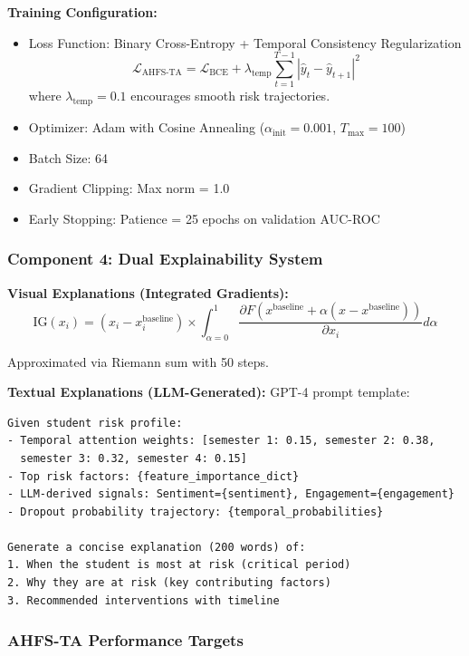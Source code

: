 \textbf{Training Configuration:}
\begin{itemize}
\item Loss Function: Binary Cross-Entropy + Temporal Consistency Regularization
\begin{equation}
\mathcal{L}_{\text{AHFS-TA}} = \mathcal{L}_{\text{BCE}} + \lambda_{\text{temp}} \sum_{t=1}^{T-1} |\hat{y}_t - \hat{y}_{t+1}|^2
\end{equation}
where $\lambda_{\text{temp}}=0.1$ encourages smooth risk trajectories.

\item Optimizer: Adam with Cosine Annealing ($\alpha_{\text{init}}=0.001$, $T_{\text{max}}=100$)
\item Batch Size: 64
\item Gradient Clipping: Max norm = 1.0
\item Early Stopping: Patience = 25 epochs on validation AUC-ROC
\end{itemize}

\subsubsection{Component 4: Dual Explainability System}

\textbf{Visual Explanations (Integrated Gradients):}
\begin{equation}
\text{IG}(x_i) = (x_i - x_i^{\text{baseline}}) \times \int_{\alpha=0}^{1} \frac{\partial F(x^{\text{baseline}} + \alpha (x - x^{\text{baseline}}))}{\partial x_i} d\alpha
\end{equation}

Approximated via Riemann sum with 50 steps.

\textbf{Textual Explanations (LLM-Generated):}
GPT-4 prompt template:
\begin{verbatim}
Given student risk profile:
- Temporal attention weights: [semester 1: 0.15, semester 2: 0.38, 
  semester 3: 0.32, semester 4: 0.15]
- Top risk factors: {feature_importance_dict}
- LLM-derived signals: Sentiment={sentiment}, Engagement={engagement}
- Dropout probability trajectory: {temporal_probabilities}

Generate a concise explanation (200 words) of:
1. When the student is most at risk (critical period)
2. Why they are at risk (key contributing factors)
3. Recommended interventions with timeline
\end{verbatim}

\subsubsection{AHFS-TA Performance Targets}

